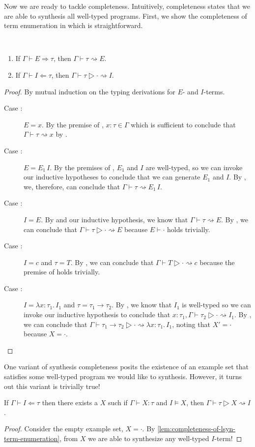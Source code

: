 Now we are ready to tackle completeness.
Intuitively, completeness states that we are able to synthesis all well-typed programs.
First, we show the completeness of term enumeration in \lsyn{} which is straightforward.
\begin{lemma}\ %
\label{lem:completeness-of-lsyn-term-enumeration}
  \begin{enumerate}
    \item If $Γ ⊢ E ⇒ τ$, then $Γ ⊢ τ ⇝ E$.
    \item If $Γ ⊢ I ⇐ τ$, then $Γ ⊢ τ ▷ · ⇝ I$.
  \end{enumerate}
\end{lemma}
\begin{proof}
  By mutual induction on the typing derivations for $E$- and $I$-terms.
  \begin{description}
    \item[Case :]
      $E = x$.
      By the premise of , $x{:}τ ∈ Γ$ which is sufficient to conclude that $Γ ⊢ τ ⇝ x$ by .
    \item[Case :]
      $E = E_1\,I$.
      By the premises of , $E_1$ and $I$ are well-typed, so we can invoke our inductive hypotheses to conclude that we can generate $E_1$ and $I$.
      By , we, therefore, can conclude that $Γ ⊢ τ ⇝ E_1\,I$.
    \item[Case :]
      $I = E$.
      By  and our inductive hypothesis, we know that $Γ ⊢ τ ⇝ E$.
      By , we can conclude that $Γ ⊢ τ ▷ · ⇝ E$ because $E ⊢ ·$ holds trivially.
    \item[Case :]
      $I = c$ and $τ = T$.
      By , we can conclude that $Γ ⊢ T ▷ · ⇝ c$ because the premise of  holds trivially.
    \item[Case :]
      $I = λx{:}τ_1.\,I_1$ and $τ = τ_1 → τ_2$.
      By , we know that $I_1$ is well-typed so we can invoke our inductive hypothesis to conclude that $x{:}τ_1, Γ ⊢ τ_2 ▷ · ⇝ I_1$.
      By , we can conclude that $Γ ⊢ τ_1 → τ_2 ▷ · ⇝ λx{:}τ_1.\,I_1$, noting that $Χ' = ·$ because $Χ = ·$.
  \end{description}
\end{proof}

One variant of synthesis completeness posits the existence of an example set that satisfies some well-typed program we would like to synthesis.
However, it turns out this variant is trivially true!
\begin{lemma}
If $Γ ⊢ I ⇐ τ$ then there exists a $Χ$ such if $Γ ⊢ Χ : τ$ and $I ⊨ Χ$, then $Γ ⊢ τ ▷ Χ ⇝ I$.
\end{lemma}
\begin{proof}
  Consider the empty example set, $Χ = ·$.
  By \autoref{lem:completeness-of-lsyn-term-enumeration}, from $Χ$ we are able to synthesize any well-typed $I$-term!
\end{proof}

